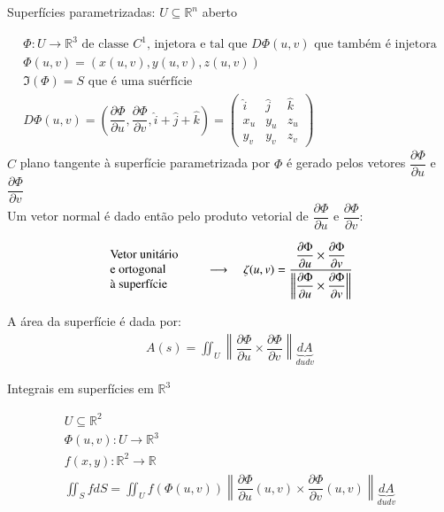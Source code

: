 \begin{large}
	Superfícies parametrizadas: $U \subseteq \mathbb{R}^n$ aberto
\end{large}
\begin{gather*}
\Phi :U\to\mathbb{R}^3 \text{ de classe } C^1 \text{, injetora e tal que } D\Phi(u,v) \text{ que também é injetora} \\ \Phi(u,v)=(x(u,v),y(u,v),z(u,v))\\
\Im(\Phi) = S \text{ que é uma suérfície}\\
D\Phi(u,v)=\left( \dfrac{\partial \Phi}{\partial u}, \dfrac{\partial \Phi}{\partial v}, \hat{i}+\hat{j}+\hat{k}\right) = \begin{pmatrix}
\hat{i} & \hat{j} & \hat{k} \\
x_u & y_u & z_u \\
y_v & y_v & z_v
\end{pmatrix}
\end{gather*}
\null\hspace{48pt}$C$ plano tangente à superfície parametrizada por $\Phi$ é gerado pelos vetores $\dfrac{\partial \Phi}{\partial u}$ e $\dfrac{\partial \Phi}{\partial v}$\\
\null\hspace{48pt}Um vetor normal é dado então pelo produto vetorial de $\dfrac{\partial \Phi}{\partial u}$ e $\dfrac{\partial \Phi}{\partial v}$:

\begin{gather*}
\text{
\begin{minipage}{68pt}
Vetor unitário \\ e ortogonal\\ à superfície
\end{minipage}}\hspace{10pt}\longrightarrow \hspace{10pt}
\zeta (u,v) = \dfrac{\dfrac{\partial \Phi}{\partial u} \times \dfrac{\partial \Phi}{\partial v}}{\left\lVert \dfrac{\partial \Phi}{\partial u} \times \dfrac{\partial \Phi}{\partial v}\right\rVert}
\end{gather*}

\null\hspace{48pt}A área da superfície é dada por:
\begin{gather*}
A(s)=\displaystyle\iint_U \left\lVert \dfrac{\partial \Phi}{\partial u} \times \dfrac{\partial \Phi}{\partial v}\right\rVert \underbrace{dA}_{dudv}
\end{gather*}

\begin{large}
Integrais em superfícies em $\mathbb{R}^3$
\end{large}
\begin{gather*}
U \subseteq \mathbb{R}^2 \\
\Phi(u,v) :U\to \mathbb{R}^3 \\
f(x,y):\mathbb{R}^2\to \mathbb{R}\\
\displaystyle\iint_S fdS = \displaystyle\iint_U f(\Phi (u,v))\left\lVert \dfrac{\partial \Phi}{\partial u}(u,v) \times \dfrac{\partial \Phi}{\partial v}(u,v)\right\rVert \underbrace{dA}_{dudv}
\end{gather*}

